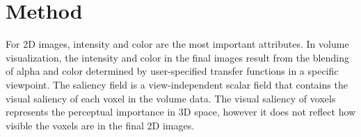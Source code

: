 




\section{Method}
For 2D images, intensity and color are the most important attributes. In volume visualization, the intensity and color in the final images result from the blending of alpha and color determined by user-specified transfer functions in a specific viewpoint.
The saliency field is a view-independent scalar field that contains the visual saliency of each voxel in the volume data. The visual saliency of voxels represents the perceptual importance in 3D space, however it does not reflect how visible the voxels are in the final 2D images.

